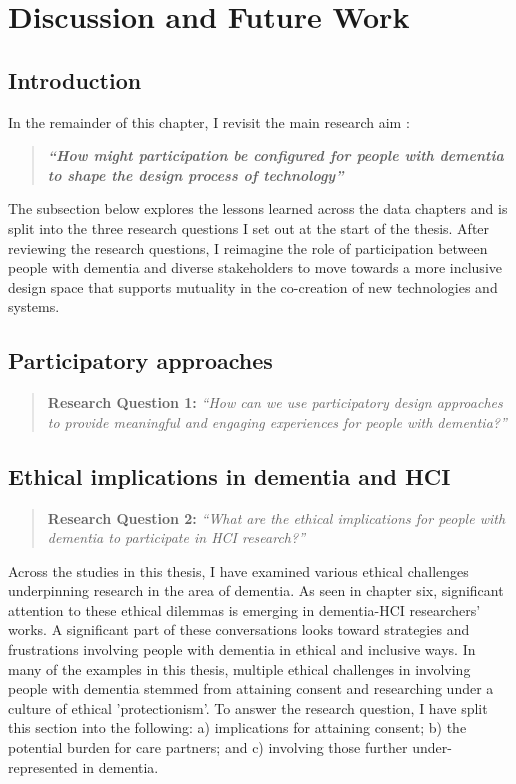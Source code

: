 \chapter{Discussion and Future Work}
\label{Discussion}

\section{Introduction}
\label{Discussion:Intro}
In the remainder of this chapter, I revisit the main research aim :
\begin{quote}
\textbf{\textit{``How might participation be configured for people with dementia to shape the design process of technology''}}
\end{quote}

The subsection below explores the lessons learned across the data chapters and is split into the three research questions I set out at the start of the thesis. After reviewing the research questions, I reimagine the role of participation between people with dementia and diverse stakeholders to move towards a more inclusive design space that supports mutuality in the co-creation of new technologies and systems. 

\section{Participatory approaches}
\label{Discussion:RQ1}
\begin{quote}
\textbf{    Research Question 1:
}    
\textit{    “How can we use participatory design approaches to provide meaningful and engaging experiences for people with dementia?”}
\end{quote}


\section{Ethical implications in dementia and HCI}
\label{Discussion:RQ2}
\begin{quote}
\textbf{    Research Question 2:
}    
\textit{    “What are the ethical implications for people with dementia to participate in HCI research?”}
\end{quote}

Across the studies in this thesis, I have examined various ethical challenges underpinning research in the area of dementia. As seen in chapter six, significant attention to these ethical dilemmas is emerging in dementia-HCI researchers' works. A significant part of these conversations looks toward strategies and frustrations involving people with dementia in ethical and inclusive ways. In many of the examples in this thesis, multiple ethical challenges in involving people with dementia stemmed from attaining consent and researching under a culture of ethical 'protectionism'. To answer the research question, I have split this section into the following: a) implications for attaining consent; b) the potential burden for care partners; and c) involving those further under-represented in dementia.

